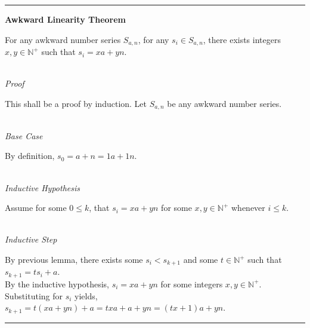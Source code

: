 \documentclass[a4paper,12pt]{article}
\begin{document}
\begin{center}
\noindent\rule{8cm}{0.4pt}
\end{center}









\label{theorem:awkward_linearity}
\hypertarget{theorem:awkward_linearity}{}
\begin{tcolorbox}
\textbf{Awkward Linearity Theorem}

For any awkward number series $S_{a,n}$, for any $s_i \in S_{a,n}$, there exists integers $x, y \in \mathbb{N}^+$ such that $s_i = xa + yn$.

\end{tcolorbox}

\noindent \\
\textit{Proof}

\noindent This shall be a proof by induction. Let $S_{a,n}$ be any awkward number series.


\noindent \\
\textit{Base Case}

\noindent By definition, $s_0 = a + n = 1a + 1n$.


\noindent \\
\textit{Inductive Hypothesis}

\noindent Assume for some $0 \leq k$, that $s_i = xa + yn$ for some $x, y \in \mathbb{N}^+$ whenever $i \leq k$.


\noindent \\
\textit{Inductive Step}

\noindent By previous lemma, there exists some $s_i < s_{k+1}$ and some $t \in \mathbb{N}^+$ such that $s_{k+1} = ts_i + a$.\\

\noindent By the inductive hypothesis, $s_i = xa + yn$ for some integers $x, y \in \mathbb{N}^+$.\\

\noindent Substituting for $s_i$ yields, $s_{k+1} = t(xa + yn) + a = txa + a + yn = (tx + 1)a + yn$.\\



\begin{center}
\noindent\rule{8cm}{0.4pt}
\end{center}
\noindent \\
\end{document}
